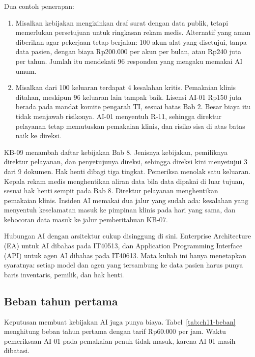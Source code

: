 Dua contoh penerapan:
\begin{enumerate}
  \item Misalkan kebijakan mengizinkan draf surat dengan data publik, tetapi memerlukan persetujuan
  untuk ringkasan rekam medis. Alternatif yang aman diberikan agar pekerjaan tetap berjalan: 100
  akun alat yang disetujui, tanpa data pasien, dengan biaya Rp200.000 per akun per bulan, atau Rp240
  juta per tahun. Jumlah itu mendekati 96 responden yang mengaku memakai AI umum.
  \item Misalkan dari 100 keluaran terdapat 4 kesalahan kritis. Pemakaian klinis ditahan, meskipun
  96 keluaran lain tampak baik. Lisensi AI-01 Rp150 juta berada pada mandat komite pengarah TI,
  sesuai batas Bab 2. Besar biaya itu tidak menjawab risikonya. AI-01 menyentuh R-11, sehingga
  direktur pelayanan tetap memutuskan pemakaian klinis, dan risiko sisa di atas batas naik ke
  direksi.
\end{enumerate}

KB-09 menambah daftar kebijakan Bab 8. Jenisnya kebijakan, pemiliknya direktur pelayanan, dan
penyetujunya direksi, sehingga direksi kini menyetujui 3 dari 9 dokumen. Hak henti dibagi tiga
tingkat. Pemeriksa menolak satu keluaran. Kepala rekam medis menghentikan aliran data bila data
dipakai di luar tujuan, sesuai hak henti sempit pada Bab 8. Direktur pelayanan menghentikan
pemakaian klinis. Insiden AI memakai dua jalur yang sudah ada: kesalahan yang menyentuh keselamatan
masuk ke pimpinan klinis pada hari yang sama, dan kebocoran data masuk ke jalur pemberitahuan KB-07.

Hubungan AI dengan arsitektur cukup disinggung di sini. Enterprise Architecture (EA) untuk AI
dibahas pada IT40513, dan Application Programming Interface (API) untuk agen AI dibahas pada
IT40613. Mata kuliah ini hanya menetapkan syaratnya: setiap model dan agen yang tersambung ke data
pasien harus punya baris inventaris, pemilik, dan hak henti.

\subsection*{Beban tahun pertama}

Keputusan membuat kebijakan AI juga punya biaya. Tabel~\ref{tab:ch11-beban} menghitung beban tahun
pertama dengan tarif Rp60.000 per jam. Waktu pemeriksaan AI-01 pada pemakaian penuh tidak masuk,
karena AI-01 masih dibatasi.

